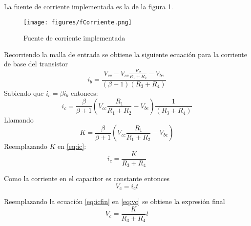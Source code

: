 \documentclass[../../ASSD_TP1_G7.tex]{subfiles}
\begin{document}
La fuente de corriente implementada es la de la figura \ref{fig:fuenteCorriente}. 
\begin{figure}[H]
\centering
\texttt{[image: figures/fCorriente.png]}
\caption{Fuente de corriente implementada}\label{fig:fuenteCorriente}
\end{figure}
Recorriendo la malla de entrada se obtiene la siguiente ecuación para la corriente de base del transistor
\begin{equation}
i_b=\frac{V_{cc}-V_{cc}\frac{R_2}{R_1 + R_2}-V_{be}}{(\beta + 1)(R_3 + R_4)}
\end{equation}
Sabiendo que $i_c=\beta i_b$ entonces:
\begin{equation}
i_c= \frac{\beta}{\beta + 1} \left( V_{cc} \frac{R_1}{R_1 + R_2} -V_{be} \right) \frac{1}{(R_3 + R_4)} \label{eq:ic}
\end{equation}
Llamando 
\begin{equation}
K=\frac{\beta}{\beta + 1} \left( V_{cc} \frac{R_1}{R_1 + R_2} -V_{be} \right)
\end{equation}
Reemplazando $K$ en \ref{eq:ic}:
\begin{equation}
i_c=\frac{K}{R_3 + R_4} \label{eq:icfin}
\end{equation}

Como la corriente en el capacitor es constante entonces
\begin{equation}
V_c=i_c t \label{eq:vc}
\end{equation}

Reemplazando la ecuación \ref{eq:icfin} en \ref{eq:vc} se obtiene la expresión final
\begin{equation}
V_c=\frac{K}{R_3 + R_4} t 
\end{equation}
\end{document}
